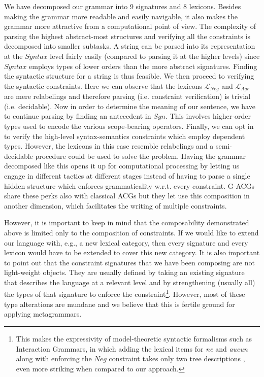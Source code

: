 \documentclass{llncs}
\begin{document}
We have decomposed our grammar into 9 signatures and 8 lexicons. Besides
making the grammar more readable and easily navigable, it also makes the
grammar more attractive from a computational point of view. The complexity of
parsing the highest abstract-most structures and verifying all the constraints
is decomposed into smaller subtasks. A string can be parsed into its
representation at the $Syntax$ level fairly easily (compared to parsing it at
the higher levels) since $Syntax$ employs types of lower orders than the more
abstract signatures. Finding the syntactic structure for a string is thus
feasible. We then proceed to verifying the syntactic constraints. Here we can
observe that the lexicons $\mathcal{L}_{Neg}$ and $\mathcal{L}_{Agr}$ are mere
relabelings and therefore parsing (i.e. constraint verification) is trivial
(i.e. decidable). Now in order to determine the meaning of our sentence, we
have to continue parsing by finding an antecedent in $Syn$. This involves
higher-order types used to encode the various scope-bearing
operators. Finally, we can opt in to verify the high-level syntax-semantics
constraints which employ dependent types. However, the lexicons in this case
resemble relabelings and a semi-decidable procedure could be used to solve the
problem. Having the grammar decomposed like this opens it up for computational
processing by letting us engage in different tactics at different stages
instead of having to parse a single hidden structure which enforces
grammaticality w.r.t. every constraint. G-ACGs share these perks also with
classical ACGs but they let use this composition in another dimension, which
facilitates the writing of multiple constraints.

However, it is important to keep in mind that the composability demonstrated
above is limited only to the composition of constraints. If we would like to
extend our language with, e.g., a new lexical category, then every signature
and every lexicon would have to be extended to cover this new category. It is
also important to point out that the constraint signatures that we have been
composing are not light-weight objects. They are usually defined by taking an
existing signature that describes the language at a relevant level and by
strengthening (usually all) the types of that signature to enforce the
constraint\footnote{This makes the expressivity of model-theoretic syntactic
  formalisms such as Interaction Grammars, in which adding the lexical items
  for \emph{ne} and \emph{aucun} along with enforcing the $Neg$ constraint
  takes only two tree descriptions \cite{perrier2007french}, even more
  striking when compared to our approach.}. However, most of these type
alterations are mundane and we believe that this is fertile ground for
applying metagrammars.
\end{document}
